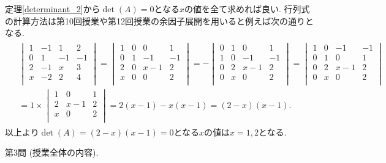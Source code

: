 \documentclass[dvipdfmx,a4paper,11pt]{article}
\theoremstyle{definition}
\begin{document}
  \vspace{11pt}
 
\hspace{-11pt}{\Large $\bullet$ 第2問解答例.}

定理\ref{determinant_2}から$\det(A)=0$となる$x$の値を全て求めれば良い.
行列式の計算方法は第10回授業や第12回授業の余因子展開を用いると例えば次の通りとなる.
\begin{align*}
\begin{split}
 & \begin{vmatrix}
1 &-1&1 &2\\
0 & 1&-1 &-1\\
2 &-1&x &3\\
x &-2&2&4\\
 \end{vmatrix}
 =
  \begin{vmatrix}
1 &0&0 &1\\
0 & 1&-1 &-1\\
2 &0&x-1 &2\\
x &0&0&2\\
 \end{vmatrix}
  =
 - \begin{vmatrix}
0&1&0 &1\\
1 & 0&-1 &-1\\
0 &2&x-1 &2\\
0 &x&0&2\\
 \end{vmatrix}
  =
\begin{vmatrix}
1 & 0&-1 &-1\\
0&1&0 &1\\
0 &2&x-1 &2\\
0 &x&0&2\\
 \end{vmatrix} \\
 &= 1 \times 
 \begin{vmatrix}
1&0 &1\\
2&x-1 &2\\
x&0&2\\
 \end{vmatrix}
 = 
 2 (x-1) - x (x-1)
 = (2-x) (x-1).
\end{split}
\end{align*}
以上より$\det(A)=(2-x) (x-1) =0$となる$x$の値は$x = 1,2$となる.

 
 \vspace{22pt}
 
   
{\Large 第3問} (授業全体の内容).
    \vspace{11pt}
  
\end{document}
